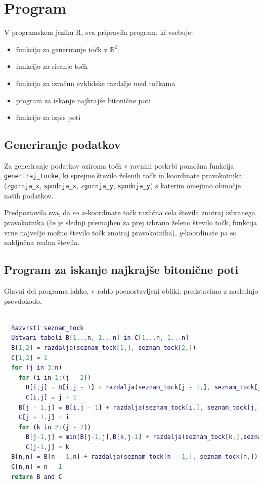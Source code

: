 \documentclass[12pt,a4paper]{amsart}
\theoremstyle{definition}
\theoremstyle{plain}
\newcommand{\R}{\mathbb R}
\begin{document}
\section{Program}

\noindent
V programskem jeziku R, sva pripravila program, ki vsebuje:

\begin{itemize}
  \item funkcijo za generiranje točk v $\R^2$
  \item funkcijo za risanje točk
  \item funkcijo za izračun evklidske razdalje med točkama
  \item program za iskanje najkrajše bitonične poti
  \item funkcijo za izpis poti
  \newline

\end{itemize}

\subsection{Generiranje podatkov}

\noindent
Za generiranje podatkov oziroma točk v ravnini poskrbi pomožna funkcija \texttt{generiraj\_tocke}, ki sprejme
število želenih točk in koordinate pravokotnika (\texttt{zgornja\_x}, \texttt{spodnja\_x}, \texttt{zgornja\_y},
\texttt{spodnja\_y}) s katerim omejimo območje naših podatkov. 
\newline

\noindent
Predpostavila sva, da so $x$-koordinate točk
različna cela števila znotraj izbranega pravokotnika (če je slednji premajhen za prej izbrano želeno število
točk, funkcija vrne največje možno število točk znotraj pravokotnika), $y$-koordinate pa so naključna
realna števila.
\newline

\subsection{Program za iskanje najkrajše bitonične poti}

\noindent
Glavni del programa lahko, v rahlo poenostavljeni obliki, predstavimo z naslednjo
psevdokodo.
\newline

\begin{lstlisting}[basicstyle=\tiny, language=Matlab]

  Razvrsti seznam_tock
  Ustvari tabeli B[1...n, 1...n] in C[1...n, 1...n]
  B[1,2] = razdalja(seznam_tock[1,], seznam_tock[2,])
  C[1,2] = 1
  for (j in 3:n)
    for (i in 1:(j - 2))
      B[i,j] = B[i,j - 1] + razdalja(seznam_tock[j - 1,], seznam_tock[j,])
      C[i,j] = j - 1
    B[j - 1,j] = B[i,j - 1] + razdalja(seznam_tock[i,], seznam_tock[j,])
    C[j - 1,j] = i
    for (k in 2:(j - 2))
      B[j-1,j] = min(B[j-1,j],B[k,j-1] + razdalja(seznam_tock[k,],seznam_tock[j,]))
      C[j-1,j] = k
  B[n,n] = B[n - 1,n] + razdalja(seznam_tock[n - 1,], seznam_tock[n,])
  C[n,n] = n - 1
  return B and C

\end{lstlisting}
\end{document}
